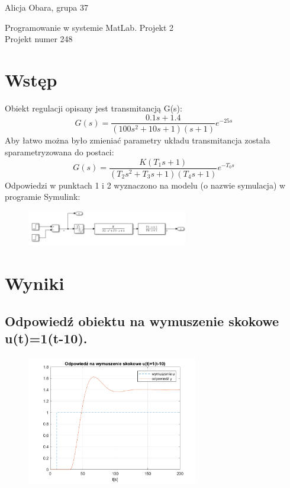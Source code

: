 \documentclass[a4paper]{article}
\begin{document}
	
\pagestyle{plain}
{\raggedright Alicja Obara, grupa 37 \\}
{\centering \Large Programowanie w systemie MatLab. Projekt 2\\Projekt numer 248 \\}
\renewcommand{\thesection}{\Roman{section}}
\section{Wstęp}
Obiekt regulacji opisany jest transmitancją G(s):
$$G(s)=\frac{0.1s+1.4}{(100s^2 +10s+1)(s+1)} e^{-25s}$$
Aby łatwo można było zmieniać parametry układu transmitancja została sparametryzowana do postaci:
$$G(s)=\frac{K (T_1 s+1)}{(T_2 s^2 +T_3 s+1)(T_4 s+1)} e^{-T_0 s}$$
Odpowiedzi w punktach 1 i 2 wyznaczono na modelu (o nazwie symulacja) w programie Symulink:
\begin{figure}[H]
	\centering
	\includegraphics[width=7cm]{modelsymulacja} 
\end{figure}

\section{Wyniki}

\renewcommand{\thesubsection}{\arabic{subsection}}

\subsection{Odpowiedź obiektu na wymuszenie skokowe u(t)=1(t-10).}
\begin{figure}[H]
	\centering
	\includegraphics[width=7.5cm]{pkt1} 
\end{figure}
\end{document}
